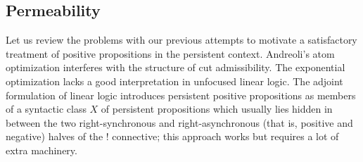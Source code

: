 

\subsection{Permeability}
\label{sec:permeable}

Let us review the problems with our previous attempts to motivate a
satisfactory treatment of positive propositions in the persistent
context.  Andreoli's atom optimization interferes with the structure
of cut admissibility. The exponential optimization lacks a good
interpretation in unfocused linear logic. The adjoint formulation of
linear logic introduces persistent positive propositions as members of
a syntactic class $X$ of persistent propositions which usually lies
hidden in between the two right-synchronous and right-asynchronous
(that is, positive and negative) halves of the ${!}$ connective; this
approach works but requires a lot of extra machinery.

